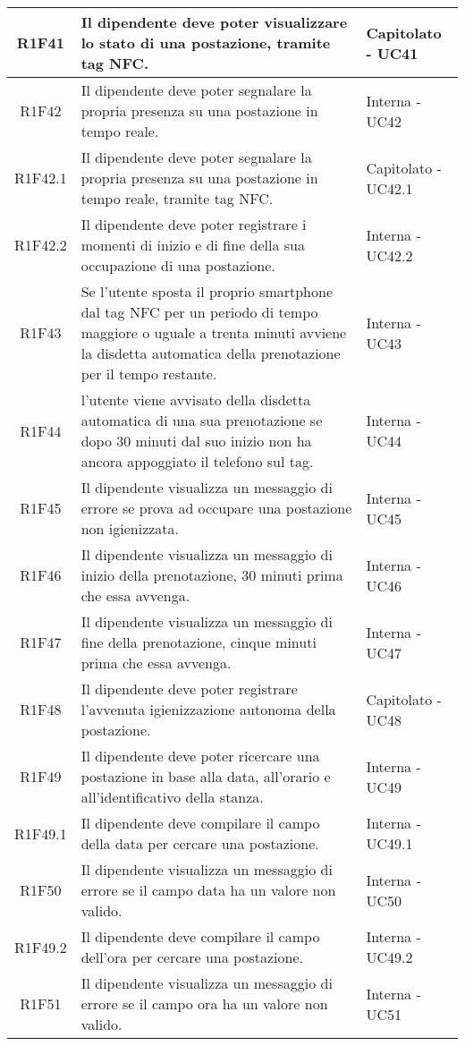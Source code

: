 \begin{center}
\begin{longtable}{|c|p{10cm}|p{4cm}|}
		\hline
		R1F41&Il dipendente deve poter visualizzare lo stato di una postazione, tramite tag NFC.	&Capitolato - UC41 	\\
		\hline
		R1F42 & Il dipendente deve poter segnalare la propria presenza su una postazione in tempo reale. & Interna - UC42 \\
		\hline
		R1F42.1&Il dipendente deve poter segnalare la propria presenza su una postazione in tempo reale, tramite tag NFC.	&Capitolato - UC42.1 	\\
		\hline
		R1F42.2&Il dipendente deve poter registrare i momenti di inizio e di fine della sua occupazione di una postazione.	&Interna - UC42.2 	\\
		\hline
		R1F43&Se l'utente sposta il proprio smartphone dal tag NFC per un periodo di tempo maggiore o uguale a trenta minuti avviene la disdetta automatica della prenotazione per il tempo restante.	&Interna - UC43 	\\
		\hline
		R1F44&l’utente viene avvisato della disdetta automatica di una sua prenotazione se dopo 30 minuti dal suo inizio non ha ancora appoggiato il telefono sul tag.	&Interna - UC44 	\\
		\hline
		R1F45&Il dipendente visualizza un messaggio di errore se prova ad occupare una postazione non igienizzata. &Interna - UC45 	\\
		\hline	
		R1F46&Il dipendente visualizza un messaggio di inizio della prenotazione, 30 minuti prima che essa avvenga.	&Interna - UC46 	\\
		\hline
		R1F47&Il dipendente visualizza un messaggio di fine della prenotazione, cinque minuti prima che essa avvenga.	&Interna - UC47 	\\
		\hline
		R1F48&Il dipendente deve poter registrare l'avvenuta igienizzazione autonoma della postazione.	&Capitolato - UC48	\\
		\hline	
		R1F49&Il dipendente deve poter ricercare una postazione in base alla data, all'orario e all'identificativo della stanza.	&Interna - UC49	\\
		\hline
			R1F49.1&Il dipendente deve compilare il campo della data per cercare una postazione.	&Interna - UC49.1	\\
		\hline
			R1F50&Il dipendente visualizza un messaggio di errore se il campo data ha un valore non valido.	&Interna - UC50	\\
		\hline
			R1F49.2&Il dipendente deve compilare il campo dell'ora per cercare una postazione.	&Interna - UC49.2	\\
		\hline
			R1F51&Il dipendente visualizza un messaggio di errore se il campo ora ha un valore non valido.	&Interna - UC51	\\

\end{longtable}
\end{center}
